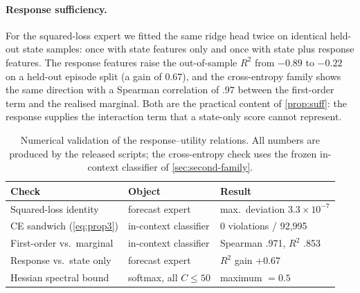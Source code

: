 \paragraph{Response sufficiency.}
For the squared-loss expert we fitted the same ridge head twice on identical
held-out state samples: once with state features only and once with state plus
response features. The response features raise the out-of-sample $R^2$ from
$-0.89$ to $-0.22$ on a held-out episode split (a gain of $0.67$), and the
cross-entropy family shows the same direction with a Spearman correlation of
$.97$ between the first-order term and the realised marginal. Both are the
practical content of \cref{prop:suff}: the response supplies the interaction
term that a state-only score cannot represent.

\begin{table}[t]
 \centering
 \caption{Numerical validation of the response--utility relations. All numbers
 are produced by the released scripts; the cross-entropy check uses the frozen
 in-context classifier of \cref{sec:second-family}.}
 \label{tab:theory-validation}
 \begin{tabular}{lll}
  \toprule
  Check & Object & Result \\
  \midrule
  Squared-loss identity & forecast expert & max.\ deviation $3.3\times10^{-7}$\\
  CE sandwich (\cref{eq:prop3}) & in-context classifier & 0 violations / 92{,}995\\
  First-order vs.\ marginal & in-context classifier & Spearman .971, $R^2$ .853\\
  Response vs.\ state only & forecast expert & $R^2$ gain $+0.67$\\
  Hessian spectral bound & softmax, all $C\le 50$ & maximum $=0.5$\\
  \bottomrule
 \end{tabular}
\end{table}
